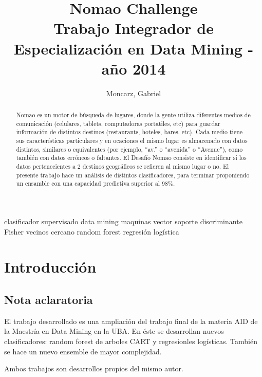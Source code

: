 \documentclass[journal]{IEEEtran}
\begin{document}
\title{  Nomao Challenge \\
	{\large Trabajo Integrador de Especialización en Data Mining - año 2014} \\
} 
\author{Moncarz, Gabriel} 
\maketitle %


\begin{abstract}
Nomao es un motor de búsqueda de lugares, donde la gente utiliza diferentes medios
de comunicación (celulares, tablets, computadoras portatiles, etc) 
para guardar información de distintos destinos (restaurants, hoteles,
bares, etc). Cada medio tiene sus características particulares y 
en ocaciones el mismo lugar
es almacenado con datos distintos, similares o equivalentes (por ejemplo, ``av.'' o
``avenida'' o ``Avenue''), como también con datos erróneos o faltantes. 
El Desafío Nomao consiste en identificar si los datos pertenecientes
a 2 destinos geográficos se refieren al mismo lugar o no. El presente
trabajo hace un análisis de distintos clasificadores, para terminar
proponiendo un ensamble con una capacidad predictiva superior al 98\%.
\end{abstract}

\begin{IEEEkeywords}
clasificador supervisado data mining maquinas vector soporte
discriminante Fisher vecinos cercano random forest
regresión logística
\end{IEEEkeywords}


\section{Introducción}

\subsection{Nota aclaratoria}
El trabajo desarrollado es una ampliación del trabajo final de la materia
AID de la Maestría en Data Mining en la UBA. En éste se desarrollan nuevos
clasificadores: random forest de arboles CART y regresionles logísticas.
También se hace un nuevo ensemble de mayor complejidad.

Ambos trabajos son desarrollos propios del mismo autor.
\end{document}
